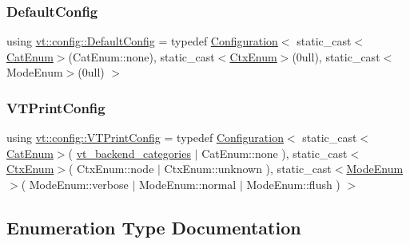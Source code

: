 \subsubsection{\texorpdfstring{Default\+Config}{DefaultConfig}}
{\footnotesize\ttfamily using \hyperlink{namespacevt_1_1config_a889b68143f3ecf39ea84dadfb9dfda3f}{vt\+::config\+::\+Default\+Config} = typedef \hyperlink{structvt_1_1config_1_1_configuration}{Configuration}$<$ static\+\_\+cast$<$\hyperlink{namespacevt_1_1config_a6bd1d6215bda0d8ca02811798399f689}{Cat\+Enum}$>$(Cat\+Enum\+::none), static\+\_\+cast$<$\hyperlink{namespacevt_1_1config_a46e57c33bee1b9f1fa95455af86d80e0}{Ctx\+Enum}$>$(0ull), static\+\_\+cast$<$\+Mode\+Enum$>$(0ull) $>$}

\mbox{\label{namespacevt_1_1config_aea109b59c3cb20cb90200caf8da049b9}} 
\subsubsection{\texorpdfstring{V\+T\+Print\+Config}{VTPrintConfig}}
{\footnotesize\ttfamily using \hyperlink{namespacevt_1_1config_aea109b59c3cb20cb90200caf8da049b9}{vt\+::config\+::\+V\+T\+Print\+Config} = typedef \hyperlink{structvt_1_1config_1_1_configuration}{Configuration}$<$ static\+\_\+cast$<$\hyperlink{namespacevt_1_1config_a6bd1d6215bda0d8ca02811798399f689}{Cat\+Enum}$>$( \hyperlink{debug__masterconfig_8h_a997597a3662694b33e86f6c351c760ff}{vt\+\_\+backend\+\_\+categories} $\vert$ Cat\+Enum\+::none ), static\+\_\+cast$<$\hyperlink{namespacevt_1_1config_a46e57c33bee1b9f1fa95455af86d80e0}{Ctx\+Enum}$>$( Ctx\+Enum\+::node $\vert$ Ctx\+Enum\+::unknown ), static\+\_\+cast$<$\hyperlink{namespacevt_1_1config_a724e99568632cc0fe9c456c2230270d0}{Mode\+Enum}$>$( Mode\+Enum\+::verbose $\vert$ Mode\+Enum\+::normal $\vert$ Mode\+Enum\+::flush ) $>$}



\subsection{Enumeration Type Documentation}
\mbox{\label{namespacevt_1_1config_a6bd1d6215bda0d8ca02811798399f689}} 
